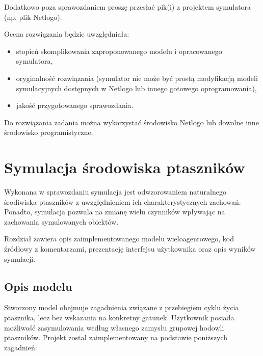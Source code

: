 \documentclass[a4paper,11pt,titlepage]{article}
\begin{document}
Dodatkowo poza sprawozdaniem proszę przesłać pik(i) z projektem symulatora (np. plik Netlogo).

Ocena rozwiązania będzie uwzględniała:
\begin{itemize}
\item stopień skomplikowania zaproponowanego modelu i opracowanego symulatora,
\item oryginalność rozwiązania (symulator nie może być prostą modyfikacją modeli symulacyjnych dostępnych w Netlogo lub innego gotowego oprogramowania),
\item jakość przygotowanego sprawozdania.
\end{itemize}

Do rozwiązania zadania można wykorzystać środowisko Netlogo lub dowolne inne środowisko programistyczne.

\section{Symulacja środowiska ptaszników}
Wykonana w sprawozdaniu symulacja jest odwzorowaniem naturalnego środiwiska ptaszników z uwzględnieniem ich charakterystycznych zachowań. Ponadto, symulacja pozwala na zmianę wielu czynników wpływając na zachowania symulowanych obiektów.

Rozdział zawiera opis zaimplementowanego modelu wieloagentowego, kod źródłowy z komentarzami, prezentację interfejsu użytkownika oraz opis wyników symulacji.

\subsection{Opis modelu}
Stworzony model obejmuje zagadnienia związane z przebiegiem cyklu życia ptasznika, lecz bez wskazania na konkretny gatunek. Użytkownik posiada możliwość zasymulowania według własnego zamysłu grupowej hodowli ptaszników. Projekt został zaimplementowany na podstawie poniższych zagadnień: 
\end{document}
